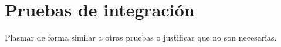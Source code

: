 \section{\forlnameref Pruebas de integración}
\label{sec:integrationTests}

\begin{shaded}
Plasmar de forma similar a otras pruebas o justificar que no son necesarias.
\end{shaded}